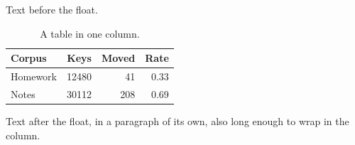 \documentclass[10pt,twocolumn]{article}
\begin{document}
Text before the float.

\begin{table}[t]
  \centering
  \caption{A table in one column.}
  \label{tab:two}
  \begin{tabular}{lrrr}
    \toprule
    Corpus & Keys & Moved & Rate \\
    \midrule
    Homework & 12480 & 41 & 0.33 \\
    Notes & 30112 & 208 & 0.69 \\
    \bottomrule
  \end{tabular}
\end{table}

Text after the float, in a paragraph of its own, also long enough to wrap in the column.
\end{document}
